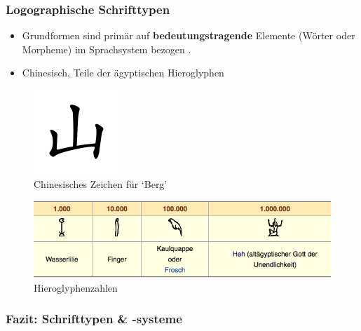 \begin{frame}
\frametitle{Logographische Schrifttypen}

\begin{itemize}
	\item Grundformen sind primär auf \textbf{bedeutungstragende} Elemente (\zB Wörter oder Morpheme) im Sprachsystem bezogen \citep[vgl.][76--77]{Duerscheid04a}. 
	
	\item Chinesisch, Teile der ägyptischen Hieroglyphen
\end{itemize}
		
\begin{minipage}{.28\textwidth}
	\begin{figure}
	\centering
	\includegraphics[scale=.45]{material/Chinesemountain-Lee-Sau-Dan}
	\caption[chinese]{Chinesisches Zeichen für `Berg'}\label{ChinBerg}
	\end{figure}
\end{minipage}\hfill%
\begin{minipage}{.68\textwidth}
	\begin{figure}
	\centering
	\includegraphics[scale=.37]{material/04Hieroglyphenzahlen}
	\caption[Hiero]{Hieroglyphenzahlen}\label{Hieroglyphen}
	\end{figure}
\end{minipage}
		
\end{frame}


\subsubsection{Fazit: Schrifttypen \& -systeme}


